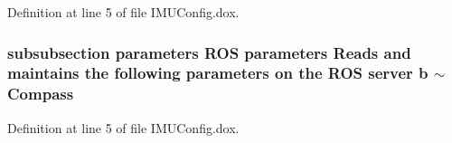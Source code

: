\-Definition at line 5 of file \-I\-M\-U\-Config.\-dox.

\subsubsection[{$\sim$\-Compass}]{\setlength{\rightskip}{0pt plus 5cm}subsubsection parameters \-R\-O\-S parameters \-Reads and maintains the following parameters on the \-R\-O\-S server b $\sim${\bf \-Compass}}\label{IMUConfig_8dox_a4ebd680224d0030155aba1e0971baacd}


\-Definition at line 5 of file \-I\-M\-U\-Config.\-dox.

